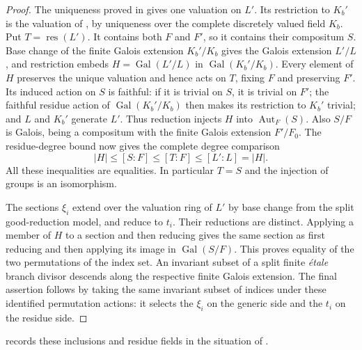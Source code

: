 \begin{proof}
The uniqueness proved in  gives one valuation
on $L'$.  Its restriction to $K_b'$ is the valuation of
, by uniqueness over the complete discretely
valued field $K_b$.  Put $T=\operatorname{res}(L')$.
It contains both $F$ and $F'$, so it contains their compositum $S$.
Base change of the finite Galois extension $K_b'/K_b$ gives the Galois
extension $L'/L$, and restriction embeds
$H=\operatorname{Gal}(L'/L)$ in $\operatorname{Gal}(K_b'/K_b)$.
Every element of $H$ preserves the unique valuation and hence acts on
$T$, fixing $F$ and preserving $F'$.  Its induced action on $S$ is
faithful: if it is trivial on $S$, it is trivial on $F'$; the faithful
residue action of $\operatorname{Gal}(K_b'/K_b)$ then makes its
restriction to $K_b'$ trivial; and $L$ and $K_b'$ generate $L'$.
Thus reduction injects $H$ into $\operatorname{Aut}_F(S)$.
Also $S/F$ is Galois, being a compositum with the finite Galois
extension $F'/F_0$.  The residue-degree bound now gives the complete
degree comparison
\begin{equation}\label{eq:residue-permutation-sandwich}
 |H|\leq[S:F]\leq[T:F]\leq[L':L]=|H|.
\end{equation}
All these inequalities are equalities.  In particular $T=S$ and the
injection of groups is an isomorphism.

The sections $\xi_i$ extend over the valuation ring of $L'$ by base
change from the split good-reduction model, and reduce to $t_i$.
Their reductions are distinct.  Applying a member of $H$ to a section
and then reducing gives the same section as first reducing and then
applying its image in $\operatorname{Gal}(S/F)$.  This proves equality
of the two permutations of the index set.  An invariant subset of a
split finite \emph{\'{e}tale} branch divisor descends along the respective
finite Galois extension.  The final assertion follows by taking the
same invariant subset of indices under these identified permutation
actions: it selects the $\xi_i$ on the generic side and the $t_i$ on
the residue side.
\end{proof}

 records these inclusions and residue fields in
the situation of .

